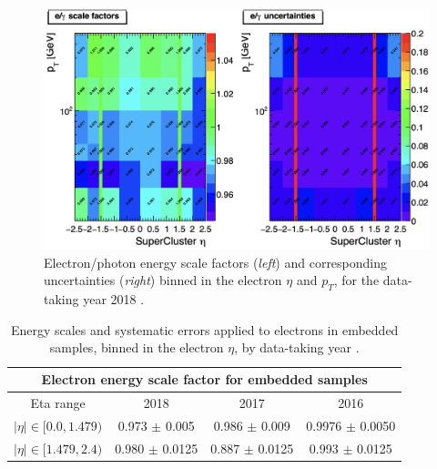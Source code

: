 \begin{figure}[h]
    \centering
    \includegraphics[width=15cm]{figures/ch-5-object-reconstruction-and-corrections-applied/egamma-POG-UL-egamma-scale-factors.png}
    \caption[Electron/photon energy scale factors and uncertainties for 2018.]{Electron/photon energy scale factors (\textit{left}) and corresponding uncertainties (\textit{right}) binned in the electron $\eta$ and $p_{T}$, for the data-taking year 2018 \cite{twiki_Electron_UL_2016_2017_2018}.} 
    \label{fig:egamma-POG-UL-egamma-scale-factors}
\end{figure}


\begin{table}[h]
    \centering
    \begin{tabular}{|c|c|c|c|}
    \hline
    \multicolumn{4}{|c|}{Electron energy scale factor for embedded samples}                                   \\ \hline
    \hline
    Eta range                   & 2018               & 2017               & 2016     \\ \hline
    $|\eta| \in [0.0, 1.479)$   & 0.973 $\pm$ 0.005  & 0.986 $\pm$ 0.009  & 0.9976 $\pm$ 0.0050 \\
    $|\eta| \in [1.479, 2.4)$   & 0.980 $\pm$ 0.0125 & 0.887 $\pm$ 0.0125 & 0.993 $\pm$ 0.0125 \\ \hline
    \end{tabular}
    \caption[Energy scales and systematic errors applied to electrons in embedded samples by data-taking year/era.]{Energy scales and systematic errors applied to electrons in embedded samples, binned in the electron $\eta$, by data-taking year \cite{twiki_embedded_preUL_2016} \cite{twiki_embedded_preUL_2017} \cite{twiki_embedded_preUL_2018}.}
    \label{table:ele-ES-embedded}
\end{table}

